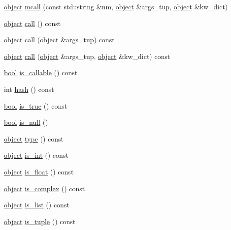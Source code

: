 \begin{DoxyCompactItemize}
\item 
\hyperlink{classpy_1_1object}{object} \hyperlink{classpy_1_1object_a2ed45f7570eedbfdd8924365c344bef5}{mcall} (const std\+::string \&nm, \hyperlink{classpy_1_1object}{object} \&args\+\_\+tup, \hyperlink{classpy_1_1object}{object} \&kw\+\_\+dict)
\item 
\hyperlink{classpy_1_1object}{object} \hyperlink{classpy_1_1object_a5a449eb3b5beb3792b8c84bc9c62e98a}{call} () const 
\item 
\hyperlink{classpy_1_1object}{object} \hyperlink{classpy_1_1object_a207fae79f7255410e07462bb857d5a04}{call} (\hyperlink{classpy_1_1object}{object} \&args\+\_\+tup) const 
\item 
\hyperlink{classpy_1_1object}{object} \hyperlink{classpy_1_1object_a0fd2aa871acce861b3dcea98a953f27b}{call} (\hyperlink{classpy_1_1object}{object} \&args\+\_\+tup, \hyperlink{classpy_1_1object}{object} \&kw\+\_\+dict) const 
\item 
\hyperlink{compiler_8h_abb452686968e48b67397da5f97445f5b}{bool} \hyperlink{classpy_1_1object_abe7ae961feed7ff55c7592adc3b20283}{is\+\_\+callable} () const 
\item 
int \hyperlink{classpy_1_1object_a82d49e5585073b71386b8aa518e56176}{hash} () const 
\item 
\hyperlink{compiler_8h_abb452686968e48b67397da5f97445f5b}{bool} \hyperlink{classpy_1_1object_a872feecc818aabcd91e1070171622fc7}{is\+\_\+true} () const 
\item 
\hyperlink{compiler_8h_abb452686968e48b67397da5f97445f5b}{bool} \hyperlink{classpy_1_1object_a39bcf56d4fef152839607b2e89ca7aff}{is\+\_\+null} ()
\item 
\hyperlink{classpy_1_1object}{object} \hyperlink{classpy_1_1object_a5be58a605c0fb1accece1549dd2a5f6e}{type} () const 
\item 
\hyperlink{classpy_1_1object}{object} \hyperlink{classpy_1_1object_a883954072ed349b1b58fe7bfb034b50a}{is\+\_\+int} () const 
\item 
\hyperlink{classpy_1_1object}{object} \hyperlink{classpy_1_1object_a5eb1697f2a66616c64cafb9e30c26a89}{is\+\_\+float} () const 
\item 
\hyperlink{classpy_1_1object}{object} \hyperlink{classpy_1_1object_a41d007b83af65257aeeb8c120d915d59}{is\+\_\+complex} () const 
\item 
\hyperlink{classpy_1_1object}{object} \hyperlink{classpy_1_1object_a20d3a4936354ace18d0bc1f798e0e2a1}{is\+\_\+list} () const 
\item 
\hyperlink{classpy_1_1object}{object} \hyperlink{classpy_1_1object_a0fdeb536b867e81f0eddc28a13830ee8}{is\+\_\+tuple} () const 

\end{DoxyCompactItemize}
